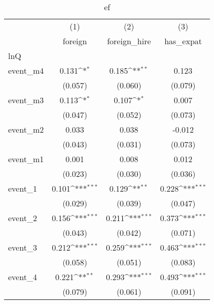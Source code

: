 \begin{table}[htbp]\centering
\def\sym#1{\ifmmode^{#1}\else\(^{#1}\)\fi}
\caption{ef}
\begin{tabular}{l*{3}{c}}
\hline\hline
            &\multicolumn{1}{c}{(1)}&\multicolumn{1}{c}{(2)}&\multicolumn{1}{c}{(3)}\\
            &\multicolumn{1}{c}{foreign}&\multicolumn{1}{c}{foreign\_hire}&\multicolumn{1}{c}{has\_expat}\\
\hline
lnQ         &                     &                     &                     \\
event\_m4    &       0.131\sym{*}  &       0.185\sym{**} &       0.123         \\
            &     (0.057)         &     (0.060)         &     (0.079)         \\
[1em]
event\_m3    &       0.113\sym{*}  &       0.107\sym{*}  &       0.007         \\
            &     (0.047)         &     (0.052)         &     (0.073)         \\
[1em]
event\_m2    &       0.033         &       0.038         &      -0.012         \\
            &     (0.043)         &     (0.031)         &     (0.073)         \\
[1em]
event\_m1    &       0.001         &       0.008         &       0.012         \\
            &     (0.023)         &     (0.030)         &     (0.036)         \\
[1em]
event\_1     &       0.101\sym{***}&       0.129\sym{**} &       0.228\sym{***}\\
            &     (0.029)         &     (0.039)         &     (0.047)         \\
[1em]
event\_2     &       0.156\sym{***}&       0.211\sym{***}&       0.373\sym{***}\\
            &     (0.043)         &     (0.042)         &     (0.071)         \\
[1em]
event\_3     &       0.212\sym{***}&       0.259\sym{***}&       0.463\sym{***}\\
            &     (0.058)         &     (0.051)         &     (0.083)         \\
[1em]
event\_4     &       0.221\sym{**} &       0.293\sym{***}&       0.493\sym{***}\\
            &     (0.079)         &     (0.061)         &     (0.091)         \\
\hline

\end{tabular}
\end{table}
